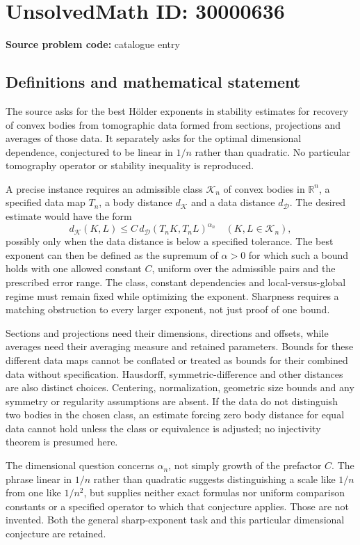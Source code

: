 \documentclass[11pt]{article}
\newcommand{\R}{\mathbb{R}}
\begin{document}
\section*{UnsolvedMath ID: 30000636}
\textbf{Source problem code:} catalogue entry
\subsection{Definitions and mathematical statement}
The source asks for the best H\"older exponents in stability estimates for recovery of convex bodies from tomographic data formed from sections, projections and averages of those data. It separately asks for the optimal dimensional dependence, conjectured to be linear in \(1/n\) rather than quadratic. No particular tomography operator or stability inequality is reproduced.

A precise instance requires an admissible class \(\mathcal K_n\) of convex bodies in \(\R^n\), a specified data map \(T_n\), a body distance \(d_{\mathcal K}\) and a data distance \(d_{\mathcal D}\). The desired estimate would have the form
\[
 d_{\mathcal K}(K,L)\leq C\,
 d_{\mathcal D}(T_nK,T_nL)^{\alpha_n}
 \quad(K,L\in\mathcal K_n),
\]
possibly only when the data distance is below a specified tolerance. The best exponent can then be defined as the supremum of \(\alpha>0\) for which such a bound holds with one allowed constant \(C\), uniform over the admissible pairs and the prescribed error range. The class, constant dependencies and local-versus-global regime must remain fixed while optimizing the exponent. Sharpness requires a matching obstruction to every larger exponent, not just proof of one bound.

Sections and projections need their dimensions, directions and offsets, while averages need their averaging measure and retained parameters. Bounds for these different data maps cannot be conflated or treated as bounds for their combined data without specification. Hausdorff, symmetric-difference and other distances are also distinct choices. Centering, normalization, geometric size bounds and any symmetry or regularity assumptions are absent. If the data do not distinguish two bodies in the chosen class, an estimate forcing zero body distance for equal data cannot hold unless the class or equivalence is adjusted; no injectivity theorem is presumed here.

The dimensional question concerns \(\alpha_n\), not simply growth of the prefactor \(C\). The phrase linear in \(1/n\) rather than quadratic suggests distinguishing a scale like \(1/n\) from one like \(1/n^2\), but supplies neither exact formulas nor uniform comparison constants or a specified operator to which that conjecture applies. Those are not invented. Both the general sharp-exponent task and this particular dimensional conjecture are retained.
\end{document}
